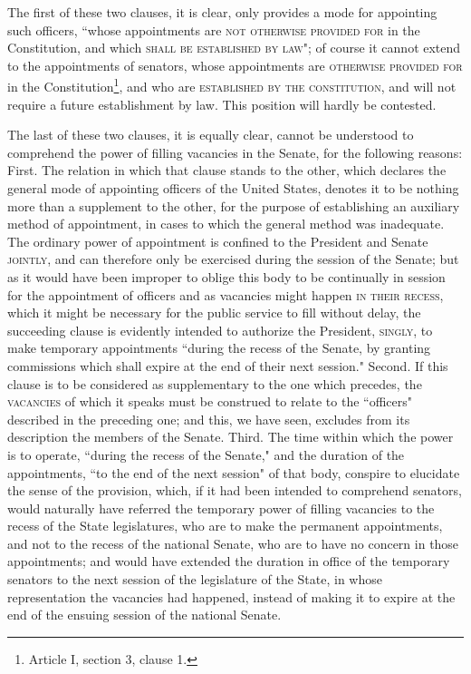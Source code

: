 The first of these two clauses, it is clear, only provides a mode for appointing such officers, ``whose appointments are \textsc{not otherwise provided for} in the Constitution, and which \textsc{shall be established by law}"; of course it cannot extend to the appointments of senators, whose appointments are \textsc{otherwise provided for} in the Constitution\footnote{Article I, section 3, clause 1.}, and who are \textsc{established by the constitution}, and will not require a future establishment by law. 
This position will hardly be contested.

The last of these two clauses, it is equally clear, cannot be understood to comprehend the power of filling vacancies in the Senate, for the following reasons: First. 
The relation in which that clause stands to the other, which declares the general mode of appointing officers of the United States, denotes it to be nothing more than a supplement to the other, for the purpose of establishing an auxiliary method of appointment, in cases to which the general method was inadequate. 
The ordinary power of appointment is confined to the President and Senate \textsc{jointly}, and can therefore only be exercised during the session of the Senate; but as it would have been improper to oblige this body to be continually in session for the appointment of officers and as vacancies might happen \textsc{in their recess}, which it might be necessary for the public service to fill without delay, the succeeding clause is evidently intended to authorize the President, \textsc{singly}, to make temporary appointments ``during the recess of the Senate, by granting commissions which shall expire at the end of their next session." Second. 
If this clause is to be considered as supplementary to the one which precedes, the \textsc{vacancies} of which it speaks must be construed to relate to the ``officers" described in the preceding one; and this, we have seen, excludes from its description the members of the Senate. 
Third. 
The time within which the power is to operate, ``during the recess of the Senate," and the duration of the appointments, ``to the end of the next session" of that body, conspire to elucidate the sense of the provision, which, if it had been intended to comprehend senators, would naturally have referred the temporary power of filling vacancies to the recess of the State legislatures, who are to make the permanent appointments, and not to the recess of the national Senate, who are to have no concern in those appointments; and would have extended the duration in office of the temporary senators to the next session of the legislature of the State, in whose representation the vacancies had happened, instead of making it to expire at the end of the ensuing session of the national Senate. 
